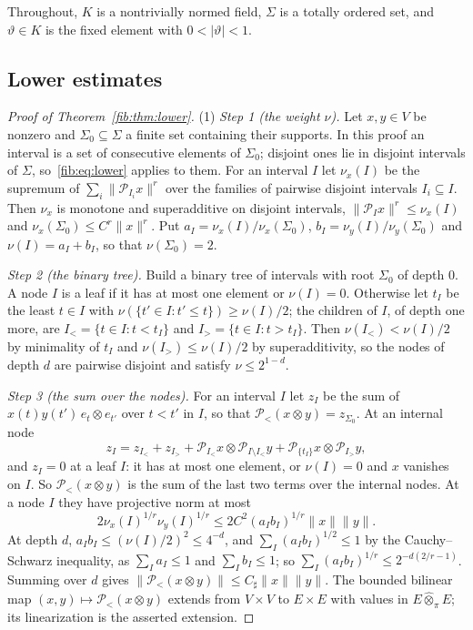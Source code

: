 \documentclass[11pt]{amsart}
\theoremstyle{definition}
\theoremstyle{remark}
\numberwithin{equation}{section}
\newcommand{\abs}[1]{\lvert #1\rvert}
\newcommand{\norm}[1]{\lVert #1\rVert}
\theoremstyle{plain}
\theoremstyle{definition}
\theoremstyle{plain}
\newcommand{\cP}{\mathcal P}
\begin{document}
Throughout, $K$ is a nontrivially normed field, $\Sigma$ is a totally ordered set, and $\vartheta\in K$ is the fixed
element with $0<\abs\vartheta<1$.

\subsection{Lower estimates}\label{ord:ssec:lower}

\begin{proof}[Proof of Theorem~\ref{fib:thm:lower}]
(1) \emph{Step 1 (the weight $\nu$).} Let $x,y\in V$ be nonzero and $\Sigma_0\subseteq\Sigma$ a finite set containing
their supports. In this proof an interval is a set of consecutive elements of $\Sigma_0$; disjoint ones lie in disjoint
intervals of $\Sigma$, so~\eqref{fib:eq:lower} applies to them. For an interval $I$ let $\nu_x(I)$ be the supremum of
$\sum_i\norm{\cP_{I_i}x}^r$ over the families of pairwise disjoint intervals $I_i\subseteq I$. Then $\nu_x$ is monotone
and superadditive on disjoint intervals, $\norm{\cP_Ix}^r\le\nu_x(I)$ and $\nu_x(\Sigma_0)\le C^r\norm x^r$. Put
$a_I=\nu_x(I)/\nu_x(\Sigma_0)$, $b_I=\nu_y(I)/\nu_y(\Sigma_0)$ and $\nu(I)=a_I+b_I$, so that $\nu(\Sigma_0)=2$.

\emph{Step 2 (the binary tree).} Build a binary tree of intervals with root $\Sigma_0$ of depth $0$. A node $I$ is a leaf
if it has at most one element or $\nu(I)=0$. Otherwise let $t_I$ be the least $t\in I$ with
$\nu(\{t'\in I:t'\le t\})\ge\nu(I)/2$; the children of $I$, of depth one more, are $I_<=\{t\in I:t<t_I\}$ and
$I_>=\{t\in I:t>t_I\}$. Then $\nu(I_<)<\nu(I)/2$ by minimality of $t_I$ and $\nu(I_>)\le\nu(I)/2$ by superadditivity,
so the nodes of depth $d$ are pairwise disjoint and satisfy $\nu\le2^{1-d}$.

\emph{Step 3 (the sum over the nodes).} For an interval $I$ let $z_I$ be the sum of $x(t)y(t')\,e_t\otimes e_{t'}$ over
$t<t'$ in $I$, so that $\cP_<(x\otimes y)=z_{\Sigma_0}$. At an internal node
\[
 z_I=z_{I_<}+z_{I_>}+\cP_{I_<}x\otimes\cP_{I\setminus I_<}y+\cP_{\{t_I\}}x\otimes\cP_{I_>}y,
\]
and $z_I=0$ at a leaf $I$: it has at most one element, or $\nu(I)=0$ and $x$ vanishes on $I$. So
$\cP_<(x\otimes y)$ is the sum of the last two terms over the internal nodes. At a node $I$ they have projective norm
at most
\[
 2\nu_x(I)^{1/r}\nu_y(I)^{1/r}\le2C^2(a_Ib_I)^{1/r}\norm x\norm y.
\]
At depth $d$, $a_Ib_I\le(\nu(I)/2)^2\le4^{-d}$, and $\sum_I(a_Ib_I)^{1/2}\le1$ by the Cauchy--Schwarz inequality, as
$\sum_Ia_I\le1$ and $\sum_Ib_I\le1$; so $\sum_I(a_Ib_I)^{1/r}\le2^{-d(2/r-1)}$. Summing over $d$ gives
$\norm{\cP_<(x\otimes y)}\le C_\sharp\norm x\norm y$. The bounded bilinear map $(x,y)\mapsto\cP_<(x\otimes y)$ extends
from $V\times V$ to $E\times E$ with values in $E\widehat\otimes_\pi E$; its linearization is the asserted extension.


\end{proof}
\end{document}
